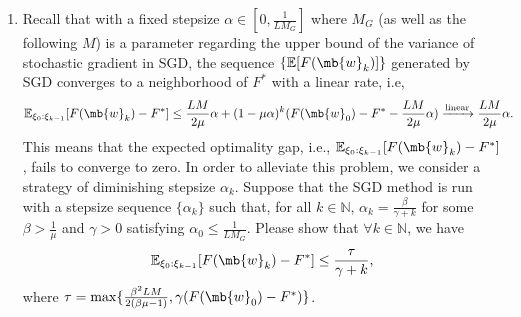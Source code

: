 \begin{exercise}
\begin{enumerate}
        \item Recall that with a fixed stepsize $\alpha\in [0,\frac{1}{LM_G}]$ where $M_G$ (as well as the following $M$) is a parameter regarding the upper bound of the variance of stochastic gradient in SGD, the sequence $\{\mathbb{E}[F(\mb{w}_k)]\}$ generated by SGD converges to a neighborhood of $F^*$ with a linear rate, i.e,
            \begin{align*}
                \mathbb{E}_{\xi_0:\xi_{k-1}}[F(\mb{w}_{k})-F^*] & \leq\frac{LM}{2\mu}\alpha+(1-\mu\alpha)^{k}(F(\mb{w}_0)-F^*-\frac{LM}{2\mu}\alpha)
                \xrightarrow[]{\textup{linear}}\frac{LM}{2\mu}\alpha.
            \end{align*}
            This means that the expected optimality gap, i.e., $\mathbb{E}_{\xi_0:\xi_{k-1}}[F(\mb{w}_{k})-F^*]$, fails to converge to zero. In order to alleviate this problem, we consider a strategy of diminishing stepsize $\alpha_k$. Suppose that the SGD method is run with a stepsize sequence $\{\alpha_k\}$ such that, for all $k \in \mathbb{N}$, $\alpha_k=\frac{\beta}{\gamma+k}$ for some $\beta>\frac{1}{\mu}$ and $\gamma>0$ satisfying $\alpha_0\leq\frac{1}{LM_G}$. Please show that $\forall k\in\mathbb{N}$, we have
            \begin{align*}
                \mathbb{E}_{\xi_0:\xi_{k-1}}[F(\mb{w}_{k})-F^*]\leq\frac{\tau}{\gamma+k},
            \end{align*}
            where $\tau=\max\{\frac{\beta^2LM}{2(\beta\mu-1)},\gamma(F(\mb{w}_0)-F^*)\}$.


\end{enumerate}
\end{exercise}
